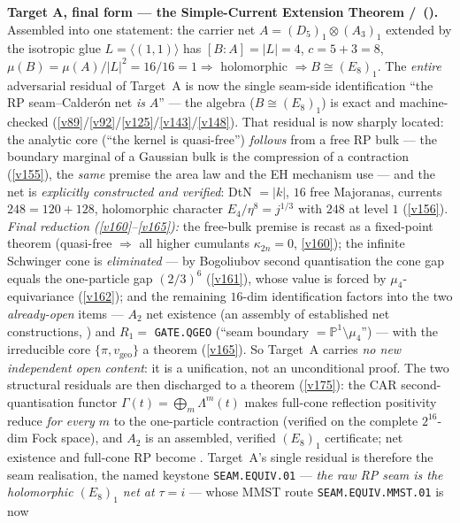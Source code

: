 \documentclass[11pt,a4paper]{article}
\begin{document}
\begin{winbox}
\smallskip\noindent\textbf{Target A, final form --- the Simple-Current Extension Theorem \mE/\mC\
().} Assembled into one statement: the carrier net
$A=(D_5)_1{\otimes}(A_3)_1$ extended by the isotropic glue $L=\langle(1,1)\rangle$ has $[B:A]{=}|L|{=}4$,
$c{=}5{+}3{=}8$, $\mu(B){=}\mu(A)/|L|^2{=}16/16{=}1\Rightarrow$ holomorphic $\Rightarrow B\cong(E_8)_1$. The
\emph{entire} adversarial residual of Target~A is now the single seam-side identification ``the RP
seam--Calder\'on net \emph{is} $A$'' --- the algebra ($B\cong(E_8)_1$) is exact and machine-checked
(\vref{v89}/\vref{v92}/\vref{v125}/\vref{v143}/\vref{v148}). That residual is now sharply located: the
analytic core (``the kernel is quasi-free'') \emph{follows} from a free RP bulk --- the boundary marginal of
a Gaussian bulk is the compression of a contraction (\vref{v155}), the \emph{same} premise the area law and
the EH mechanism use --- and the net is \emph{explicitly constructed and verified}: DtN $=|k|$, $16$ free
Majoranas, currents $248{=}120{+}128$, holomorphic character $E_4/\eta^8=j^{1/3}$ with $248$ at level $1$
(\vref{v156}). \emph{Final reduction (\vref{v160}--\vref{v165}):} the free-bulk premise is recast as a
fixed-point theorem (quasi-free $\Rightarrow$ all higher cumulants $\kappa_{2n}{=}0$, \vref{v160}); the
infinite Schwinger cone is \emph{eliminated} --- by Bogoliubov second quantisation the cone gap equals the
one-particle gap $(2/3)^6$ (\vref{v161}), whose value is forced by $\mu_4$-equivariance (\vref{v162}); and
the remaining $16$-dim identification factors into the two \emph{already-open} items --- $A_2$ net existence
(an assembly of established net constructions, \mC) and $R_1=$ \texttt{GATE.QGEO} (``seam boundary $=
\mathbb P^1{\setminus}\mu_4$'') --- with the irreducible core $\{\pi,v_{\mathrm{geo}}\}$ a theorem
(\vref{v165}). So Target~A carries \emph{no new independent open content}: it is a unification, not an
unconditional proof. The two structural residuals are then discharged to a theorem (\vref{v175}): the CAR
second-quantisation functor $\Gamma(t){=}\bigoplus_m\Lambda^m(t)$ makes full-cone reflection positivity
reduce \emph{for every $m$} to the one-particle contraction (verified on the complete $2^{16}$-dim Fock
space), and $A_2$ is an assembled, verified $(E_8)_1$ certificate; net existence and full-cone RP become
\mE. Target~A's single residual is therefore the seam realisation, the named keystone
\texttt{SEAM.EQUIV.01} --- \emph{the raw RP seam is the holomorphic $(E_8)_1$ net at $\tau{=}i$} --- whose MMST route
\texttt{SEAM.EQUIV.MMST.01} is now

\end{winbox}
\end{document}
